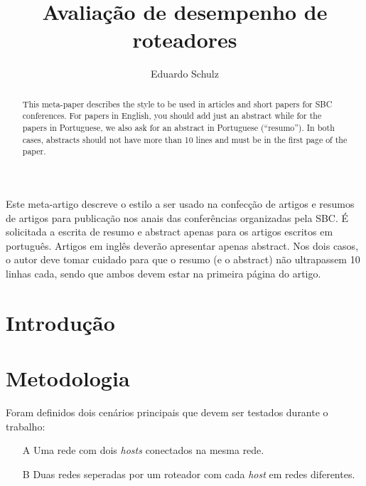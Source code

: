 \documentclass[12pt]{article}
\title{Avaliação de desempenho de roteadores}
\author{Eduardo Schulz\inst{1}}
\begin{document}
 

\maketitle

\begin{abstract}
  This meta-paper describes the style to be used in articles and short papers
  for SBC conferences. For papers in English, you should add just an abstract
  while for the papers in Portuguese, we also ask for an abstract in
  Portuguese (``resumo''). In both cases, abstracts should not have more than
  10 lines and must be in the first page of the paper.
\end{abstract}
     
\begin{resumo} 
  Este meta-artigo descreve o estilo a ser usado na confecção de artigos e
  resumos de artigos para publicação nos anais das conferências organizadas
  pela SBC. É solicitada a escrita de resumo e abstract apenas para os artigos
  escritos em português. Artigos em inglês deverão apresentar apenas abstract.
  Nos dois casos, o autor deve tomar cuidado para que o resumo (e o abstract)
  não ultrapassem 10 linhas cada, sendo que ambos devem estar na primeira
  página do artigo.
\end{resumo}


\section{Introdução}





\section{Metodologia}
Foram definidos dois cenários principais que devem ser testados durante o trabalho:
\begin{enumerate}
	\item[A] Uma rede com dois \textit{hosts} conectados na mesma rede.
	\item[B] Duas redes seperadas por um roteador com cada \textit{host} em redes diferentes. 
\end{enumerate}
\end{document}
